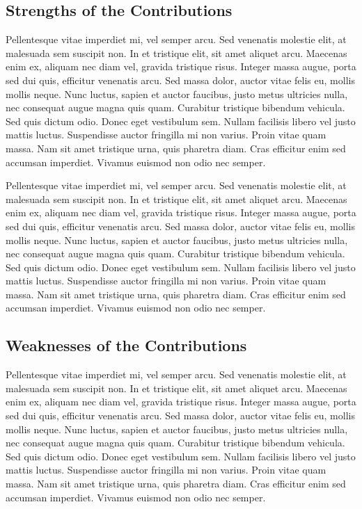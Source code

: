 \subsection{Strengths of the Contributions}
\label{sub:strengths_of_the_contributions}

Pellentesque vitae imperdiet mi, vel semper arcu. Sed venenatis molestie elit, at malesuada sem suscipit non. In et tristique elit, sit amet aliquet arcu. Maecenas enim ex, aliquam nec diam vel, gravida tristique risus. Integer massa augue, porta sed dui quis, efficitur venenatis arcu. Sed massa dolor, auctor vitae felis eu, mollis mollis neque. Nunc luctus, sapien et auctor faucibus, justo metus ultricies nulla, nec consequat augue magna quis quam. Curabitur tristique bibendum vehicula. Sed quis dictum odio. Donec eget vestibulum sem. Nullam facilisis libero vel justo mattis luctus. Suspendisse auctor fringilla mi non varius. Proin vitae quam massa. Nam sit amet tristique urna, quis pharetra diam. Cras efficitur enim sed accumsan imperdiet. Vivamus euismod non odio nec semper. \newline

Pellentesque vitae imperdiet mi, vel semper arcu. Sed venenatis molestie elit, at malesuada sem suscipit non. In et tristique elit, sit amet aliquet arcu. Maecenas enim ex, aliquam nec diam vel, gravida tristique risus. Integer massa augue, porta sed dui quis, efficitur venenatis arcu. Sed massa dolor, auctor vitae felis eu, mollis mollis neque. Nunc luctus, sapien et auctor faucibus, justo metus ultricies nulla, nec consequat augue magna quis quam. Curabitur tristique bibendum vehicula. Sed quis dictum odio. Donec eget vestibulum sem. Nullam facilisis libero vel justo mattis luctus. Suspendisse auctor fringilla mi non varius. Proin vitae quam massa. Nam sit amet tristique urna, quis pharetra diam. Cras efficitur enim sed accumsan imperdiet. Vivamus euismod non odio nec semper.  \newline



\subsection{Weaknesses of the Contributions}
\label{sub:weaknesses_of_the_contributions}

Pellentesque vitae imperdiet mi, vel semper arcu. Sed venenatis molestie elit, at malesuada sem suscipit non. In et tristique elit, sit amet aliquet arcu. Maecenas enim ex, aliquam nec diam vel, gravida tristique risus. Integer massa augue, porta sed dui quis, efficitur venenatis arcu. Sed massa dolor, auctor vitae felis eu, mollis mollis neque. Nunc luctus, sapien et auctor faucibus, justo metus ultricies nulla, nec consequat augue magna quis quam. Curabitur tristique bibendum vehicula. Sed quis dictum odio. Donec eget vestibulum sem. Nullam facilisis libero vel justo mattis luctus. Suspendisse auctor fringilla mi non varius. Proin vitae quam massa. Nam sit amet tristique urna, quis pharetra diam. Cras efficitur enim sed accumsan imperdiet. Vivamus euismod non odio nec semper.

